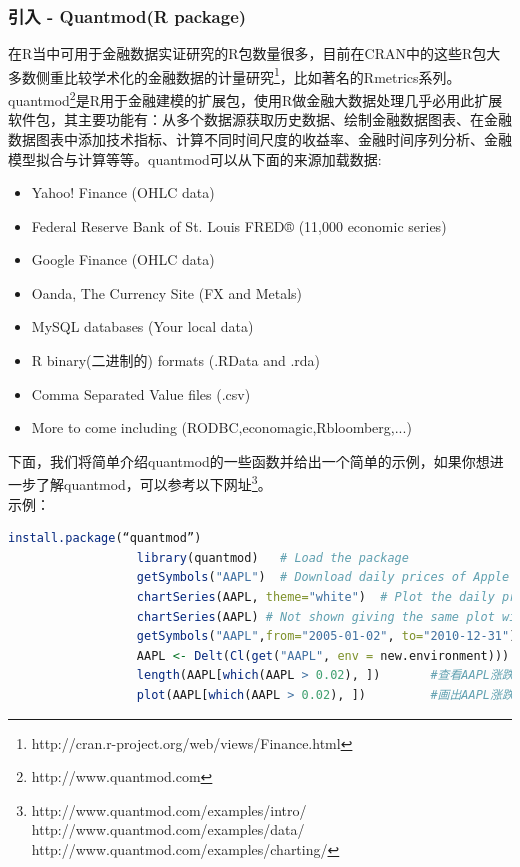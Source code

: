         \subsubsection{引入 - Quantmod(R package)}
            \par
            在R当中可用于金融数据实证研究的R包数量很多，目前在CRAN中的这些R包大多数侧重比较学术化的金融数据的计量研究\footnote{http://cran.r-project.org/web/views/Finance.html}，比如著名的Rmetrics系列。quantmod\footnote{http://www.quantmod.com}是R用于金融建模的扩展包，使用R做金融大数据处理几乎必用此扩展软件包，其主要功能有：从多个数据源获取历史数据、绘制金融数据图表、在金融数据图表中添加技术指标、计算不同时间尺度的收益率、金融时间序列分析、金融模型拟合与计算等等。quantmod可以从下面的来源加载数据:
            \begin{itemize}
              \item Yahoo! Finance (OHLC data)
              \item Federal Reserve Bank of St. Louis FRED® (11,000 economic series)
              \item Google Finance (OHLC data)
              \item Oanda, The Currency Site (FX and Metals)
              \item MySQL databases (Your local data)
              \item R binary(二进制的) formats (.RData and .rda)
              \item Comma Separated Value files (.csv)
              \item More to come including (RODBC,economagic,Rbloomberg,...)
            \end{itemize}
            \par
            下面，我们将简单介绍quantmod的一些函数并给出一个简单的示例，如果你想进一步了解quantmod，可以参考以下网址\footnote{http://www.quantmod.com/examples/intro/
            http://www.quantmod.com/examples/data/
            http://www.quantmod.com/examples/charting/
            }。\\
            示例：
                \begin{lstlisting}[language = R]
                  install.package(“quantmod”)
                  library(quantmod)   # Load the package
                  getSymbols("AAPL")  # Download daily prices of Apple stock from Yahoo
                  chartSeries(AAPL, theme="white")  # Plot the daily price and volume
                  chartSeries(AAPL) # Not shown giving the same plot with black background.
                  getSymbols("AAPL",from="2005-01-02", to="2010-12-31")
                  AAPL <- Delt(Cl(get("AAPL", env = new.environment)))
                  length(AAPL[which(AAPL > 0.02), ])       #查看AAPL涨跌幅超过2%的情况
                  plot(AAPL[which(AAPL > 0.02), ])         #画出AAPL涨跌幅超过2%的情况
                \end{lstlisting}
